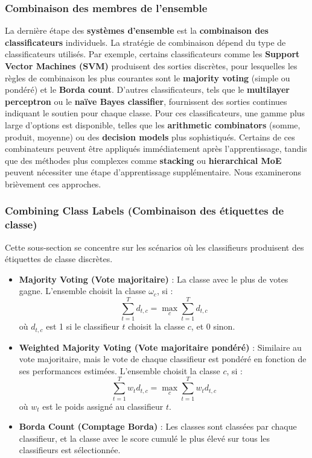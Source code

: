 \subsubsection{Combinaison des membres de l'ensemble}
La dernière étape des \textbf{systèmes d'ensemble} est la \textbf{combinaison des classificateurs} individuels. La stratégie de combinaison dépend du type de classificateurs utilisés. Par exemple, certains classificateurs comme les \textbf{Support Vector Machines (SVM)} produisent des sorties discrètes, pour lesquelles les règles de combinaison les plus courantes sont le \textbf{majority voting} (simple ou pondéré) et le \textbf{Borda count}. D'autres classificateurs, tels que le \textbf{multilayer perceptron} ou le \textbf{naïve Bayes classifier}, fournissent des sorties continues indiquant le soutien pour chaque classe. Pour ces classificateurs, une gamme plus large d'options est disponible, telles que les \textbf{arithmetic combinators} (somme, produit, moyenne) ou des \textbf{decision models} plus sophistiqués. Certains de ces combinateurs peuvent être appliqués immédiatement après l'apprentissage, tandis que des méthodes plus complexes comme \textbf{stacking} ou \textbf{hierarchical MoE} peuvent nécessiter une étape d'apprentissage supplémentaire. Nous examinerons brièvement ces approches.
\subsubsection*{Combining Class Labels (Combinaison des étiquettes de classe)}
Cette sous-section se concentre sur les scénarios où les classifieurs produisent des étiquettes de classe discrètes.

\begin{itemize}
	\item \textbf{Majority Voting (Vote majoritaire)} : La classe avec le plus de votes gagne. L'ensemble choisit la classe $\omega_c$, si :
	\[
	\sum_{t=1}^{T} d_{t,c} = \max_{c} \sum_{t=1}^{T} d_{t,c}
	\]
	où $d_{t,c}$ est 1 si le classifieur $t$ choisit la classe $c$, et 0 sinon.
	
	\item \textbf{Weighted Majority Voting (Vote majoritaire pondéré)} : Similaire au vote majoritaire, mais le vote de chaque classifieur est pondéré en fonction de ses performances estimées. L'ensemble choisit la classe $c$, si :
	\[
	\sum_{t=1}^{T} w_t d_{t,c} = \max_{c} \sum_{t=1}^{T} w_t d_{t,c}
	\]
	où $w_t$ est le poids assigné au classifieur $t$.
	
	\item \textbf{Borda Count (Comptage Borda)} : Les classes sont classées par chaque classifieur, et la classe avec le score cumulé le plus élevé sur tous les classifieurs est sélectionnée.
\end{itemize}

